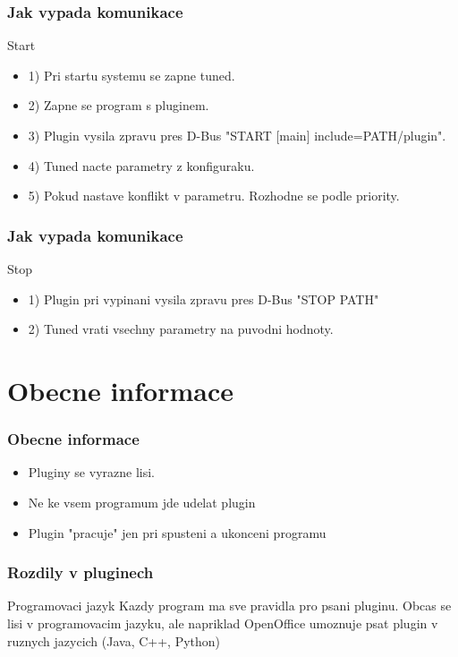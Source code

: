 \documentclass[pdf]{beamer}
\begin{document}
\begin{frame} %
	\frametitle{Jak vypada komunikace}
	\begin{block}{Start}
		\begin{itemize}
			\item 1) Pri startu systemu se zapne tuned.
			\item 2) Zapne se program s pluginem.
			\item 3) Plugin vysila zpravu pres D-Bus "START [main] include=PATH/plugin".
			\item 4) Tuned nacte parametry z konfiguraku.
			\item 5) Pokud nastave konflikt v parametru. Rozhodne se podle priority.
		\end{itemize}
	\end{block}
\end{frame}
\begin{frame}
	\frametitle{Jak vypada komunikace}
	\begin{block}{Stop}
		\begin{itemize}
			\item 1) Plugin pri vypinani vysila zpravu pres D-Bus "STOP PATH"
			\item 2) Tuned vrati vsechny parametry na puvodni hodnoty.
		\end{itemize}
	\end{block}
\end{frame} %

\section{Obecne informace}
\begin{frame} %
    \frametitle{Obecne informace}
    \begin{itemize}
        \item Pluginy se vyrazne lisi.
        \item Ne ke vsem programum jde udelat plugin
        \item Plugin "pracuje" jen pri spusteni a ukonceni programu
    \end{itemize}
\end{frame} %

\begin{frame} %
    \frametitle{Rozdily v pluginech}
     \begin{block}{Programovaci jazyk}
		Kazdy program ma sve pravidla pro psani pluginu. Obcas se lisi v programovacim jazyku, ale napriklad OpenOffice umoznuje psat plugin v ruznych jazycich (Java, C++, Python)
     \end{block}
\end{frame} %
\end{document}

